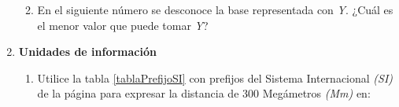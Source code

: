 \documentclass[12pt]{article}
\begin{document}
\begin{enumerate}
\begin{enumerate}

        \item En el siguiente número se desconoce la base representada con
            \emph{Y}. ¿Cuál es el menor valor que puede tomar \emph{Y}?



    \end{enumerate}

    \item \textbf{Unidades de información}

    \begin{enumerate}

        \item Utilice la tabla \ref{tablaPrefijoSI} con prefijos del Sistema Internacional
            \emph{(SI)} de la página \pageref{tablaPrefijoSI} para expresar la
            distancia de 300 Megámetros \emph{(Mm)} en:



\end{enumerate}
\end{enumerate}
\end{document}
